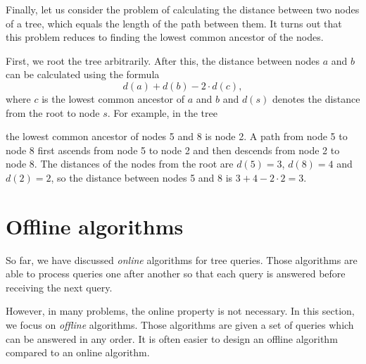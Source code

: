 Finally, let us consider the problem of
calculating the distance between
two nodes of a tree, which equals
the length of the path between them.
It turns out that this problem reduces to
finding the lowest common ancestor of the nodes.

First, we root the tree arbitrarily.
After this, the distance between nodes $a$ and $b$
can be calculated using the formula
\[d(a)+d(b)-2 \cdot d(c),\]
where $c$ is the lowest common ancestor of $a$ and $b$
and $d(s)$ denotes the distance from the root
to node $s$.
For example, in the tree

\begin{center}
\end{center}
the lowest common ancestor of nodes 5 and 8 is node 2.
A path from node 5 to node 8
first ascends from node 5 to node 2
and then descends from node 2 to node 8.
The distances of the nodes from the root are
$d(5)=3$, $d(8)=4$ and $d(2)=2$,
so the distance between nodes 5 and 8 is
$3+4-2\cdot2=3$.

\section{Offline algorithms}

So far, we have discussed \emph{online} algorithms
for tree queries.
Those algorithms are able to process
queries one after another so that
each query is answered before receiving the next query.

However, in many problems, the online
property is not necessary.
In this section, we focus on \emph{offline} algorithms.
Those algorithms are given a set of queries which can
be answered in any order.
It is often easier to design an offline algorithm
compared to an online algorithm.

